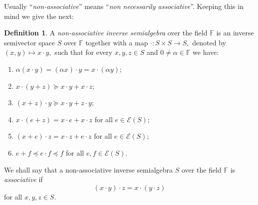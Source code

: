 \documentclass{amsart}
\newcommand{\E}{\mathcal{E}}
\newcommand{\F}{\mathbb{F}}
\newcommand{\0}{{\vartheta}}
\theoremstyle{definition}
\newtheorem{defn}[thm]{Definition}
\theoremstyle{remark}
\numberwithin{equation}{section}
\newtheorem*{Theorem A}{\textbf{Theorem A}}
\newtheorem*{Corollary E}{\textbf{Corollary E}}
\newtheorem*{Corollary F}{\textbf{Corollary F}}
\newtheorem*{Theorem B}{\textbf{Theorem B}}
\newtheorem*{Theorem C}{\textbf{Theorem C}}
\newtheorem*{Theorem D}{\textbf{Theorem B}}
\newtheorem*{p a}{\textbf{Proof of  Theorem A}}
\newtheorem*{p b}{\textbf{Proof of Theorem B}}
\newtheorem*{p c}{\textbf{Proof of  Theorem C}}
\newtheorem*{p d}{\textbf{Proof of  Theorem D}}
\begin{document}
  Usually  ``{\em non-associative}'' means ``{\em non necessarily associative}''. Keeping this in mind we give the next:

\begin{defn}\label{def4}
A  {\em non-associative inverse semialgebra}   over the field $\mathbb{F}$ is an inverse semivector space $S$ over  $\mathbb{F}$ together with 
a map  $\cdot:S \times S \rightarrow S,$ denoted by $(x,y)\mapsto x\cdot y,$ such that for every $x,y,z\in S$ and $0\neq \alpha\in \F$ we have:
\begin{enumerate}
\item $\alpha (x\cdot y)=(\alpha x)\cdot y=x\cdot (\alpha y);$

\item $x\cdot ( y+z)\succeq x\cdot y+x \cdot z;$
\item $(x+z)\cdot y\succeq x\cdot y+z\cdot y;$

\item $x\cdot ( e+z)= x\cdot e+x \cdot z$ for all $e\in \E(S);$
 \item $(x+e)\cdot z= x\cdot z+e\cdot z$  for all $e\in \E(S);$
 \item $e+f \preceq  e\cdot f \preceq  f $  for all $e,f\in \E(S).$
\end{enumerate}
\end{defn}


We shall say that  a non-associative inverse semialgebra  $S$ over the field  $\mathbb{F}$ is {\em associative}  if  $$(x\cdot y)\cdot z=x\cdot ( y\cdot z)$$
for all $ x,y,z \in S.$  
\end{document}
